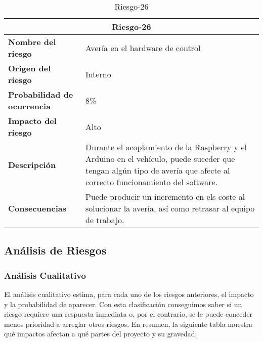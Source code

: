 \begin{table}[H]
\begin{center}
\begin{tabular}{p{} p{7cm}}
\multicolumn{2}{c}{\textbf{Riesgo-26} } \\
\hline \hline
\textbf{Nombre del riesgo} & Avería en el hardware de control \\
\hline
\textbf{Origen del riesgo} & Interno \\
\hline
\textbf{Probabilidad de ocurrencia} & 8\%  \\
\hline
\textbf{Impacto del riesgo} &  Alto \\
\hline
\textbf{Descripción} &  Durante el acoplamiento de la Raspberry y el Arduino en el vehículo, puede suceder que tengan  algún tipo de avería que afecte al correcto funcionamiento del software. \\
\hline
\textbf{Consecuencias} &  Puede producir un incremento en els coste al solucionar la avería, así como retrasar al equipo de trabajo.  \\
\hline
\end{tabular}
\caption{Riesgo-26}
\label{tab:Riesgo-26}
\end{center}
\end{table}

\subsection{Análisis de Riesgos}
\subsubsection{Análisis Cualitativo}
\par El análisis cualitativo estima, para cada uno de los riesgos anteriores, el impacto y la probabilidad de aparecer. Con esta clasificación conseguimos saber si un riesgo requiere una respuesta inmediata o, por el contrario, se le puede conceder menos prioridad a arreglar otros riesgos. En resumen, la siguiente tabla muestra qué impactos afectan a qué partes del proyecto y su gravedad:

